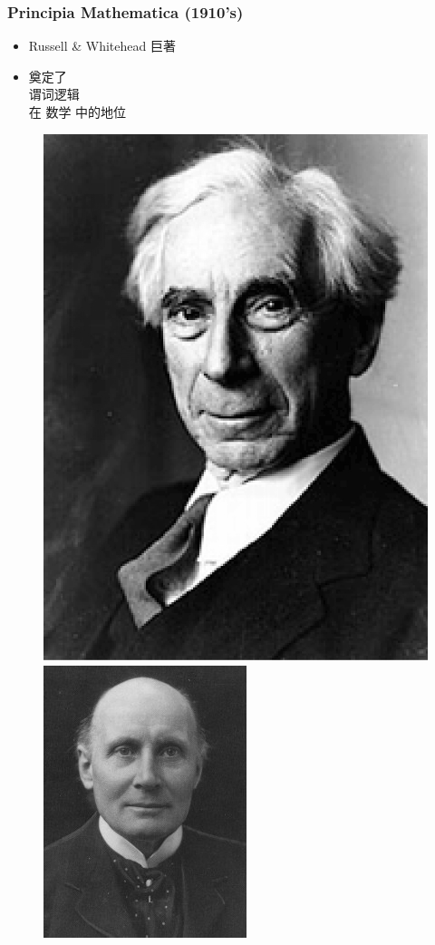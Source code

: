 \documentclass[15pt]{beamer}
\begin{document}
\begin{frame}
\frametitle{Principia Mathematica (1910's)}
\begin{minipage}[t]{0.35\linewidth}
	\begin{itemize}
		\item Russell \& Whitehead 巨著
		\item 奠定了 \\
		{\color{red}谓词逻辑} \\
		在 数学 中的地位
	\end{itemize}
\end{minipage}
\hfill
\begin{minipage}[t]{0.61\linewidth}
	\begin{figure}[H]
		\includegraphics[scale=0.1]{Russell.jpg}
		\includegraphics[scale=0.4]{Whitehead.jpg}

\end{figure}
\end{minipage}
\end{frame}
\end{document}
